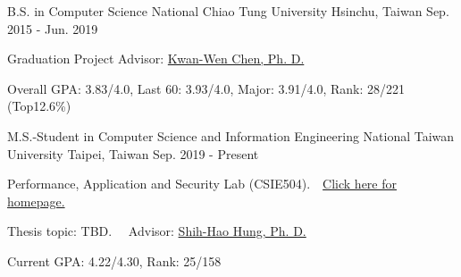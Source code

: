 

\begin{cventries}

\cventry
    {B.S. in Computer Science} %
    {National Chiao Tung University} %
    {Hsinchu, Taiwan} %
    {Sep. 2015 - Jun. 2019} %
    {
      \begin{cvitems} %
        \item {Graduation Project Advisor: \href{https://www.cs.nctu.edu.tw/members/detail/kuanwen}{Kwan-Wen Chen, Ph. D.}}
        \item {Overall GPA: 3.83/4.0, Last 60: 3.93/4.0, Major: 3.91/4.0, Rank: 28/221 (Top12.6\%)}
      \end{cvitems}
    }
    
\cventry
    {M.S.-Student in Computer Science and Information Engineering} %
    {National Taiwan University} %
    {Taipei, Taiwan} %
    {Sep. 2019 - Present} %
    {
      \begin{cvitems} %
        \item Performance, Application and Security Lab (CSIE504).\ \    \href{https://hungsh-ntucsie.blogspot.com/p/blog-page_2668.html}{Click here for homepage.}
        \item Thesis topic: TBD. \ \ Advisor: \href{https://www.csie.ntu.edu.tw/~hungsh/}{Shih-Hao Hung, Ph. D.}
        \item {Current GPA: 4.22/4.30, Rank: 25/158}
      \end{cvitems}
    }
\end{cventries}
